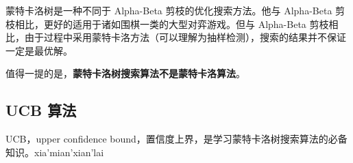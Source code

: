 
\begin{issues}
\issueDraft
\issueTODO
\end{issues}


蒙特卡洛树是一种不同于 Alpha-Beta 剪枝的优化搜索方法。他与 Alpha-Beta 剪枝相比，更好的适用于诸如围棋一类的大型对弈游戏。但与 Alpha-Beta 剪枝相比，由于过程中采用蒙特卡洛方法（可以理解为抽样检测），搜索的结果并不保证一定是最优解。

值得一提的是，\textbf{蒙特卡洛树搜索算法不是蒙特卡洛算法}。

\subsection{UCB 算法}
UCB，upper confidence bound，置信度上界，是学习蒙特卡洛树搜索算法的必备知识。xia'mian'xian'lai